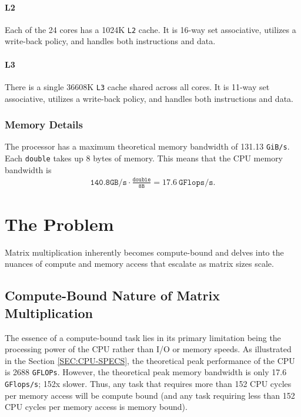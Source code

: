 \documentclass{article}
\begin{document}
\paragraph{L2}
Each of the 24 cores has a 1024K \texttt{L2} cache. It is 16-way set associative, utilizes a write-back policy, and handles both instructions and data.

\paragraph{L3}
There is a single 36608K \texttt{L3} cache shared across all cores. It is 11-way set associative, utilizes a write-back policy, and handles both instructions and data.

\subsubsection*{Memory Details}
The processor has a maximum theoretical memory bandwidth of 131.13 \texttt{GiB/s}. 
Each \texttt{double} takes up 8 bytes of memory. This means that the CPU memory bandwidth is 
\begin{align*}
    \texttt{140.8GB/s} \cdot \frac{\texttt{double}}{\texttt{8B}} = 17.6\ \texttt{GFlops/s}.
\end{align*}

\section{The Problem}

Matrix multiplication inherently becomes compute-bound and delves into the 
nuances of compute and memory access that escalate as matrix sizes scale.

\subsection{Compute-Bound Nature of Matrix Multiplication}

The essence of a compute-bound task lies in its primary limitation being the 
processing power of the CPU rather than I/O or memory speeds. As illustrated in the Section \ref{SEC:CPU-SPECS}, the theoretical peak performance of the CPU is
2688 \texttt{GFLOPs}. However, the theoretical peak memory bandwidth is only 17.6 \texttt{GFlops/s};
152x slower. Thus, any task that requires more than 152 CPU cycles per memory access will be
compute bound (and any task requiring less than 152 CPU cycles per memory access is memory bound).
\end{document}
